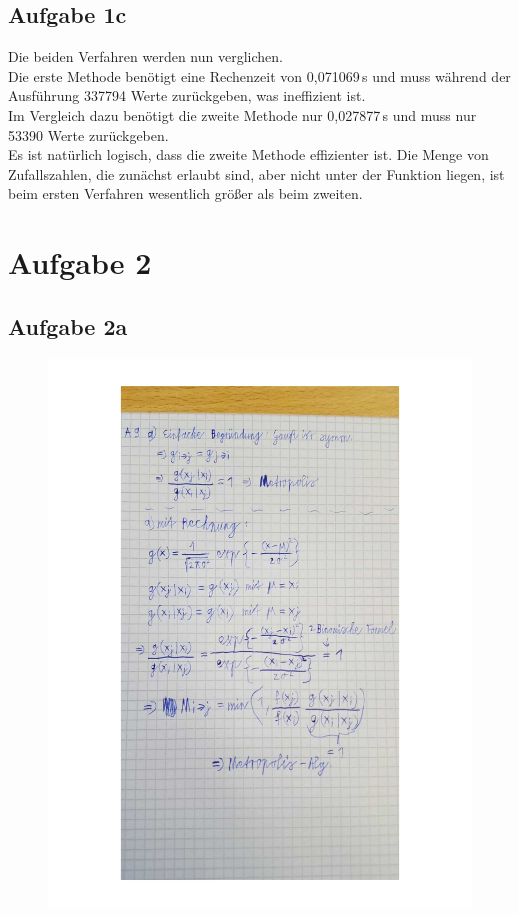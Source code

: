     \subsection{Aufgabe 1c}

      Die beiden Verfahren werden nun verglichen. \\
      Die erste Methode benötigt eine Rechenzeit von 0,071069\,s und
      muss während der Ausführung 337794 Werte zurückgeben, was ineffizient ist.\\
      Im Vergleich dazu benötigt die zweite Methode nur 0,027877\,s und
      muss nur 53390 Werte zurückgeben.\\
      Es ist natürlich logisch, dass die
      zweite Methode effizienter ist. Die Menge von Zufallszahlen, die
      zunächst erlaubt sind, aber nicht unter der Funktion liegen, ist beim
      ersten Verfahren wesentlich größer als beim zweiten.

  \section{Aufgabe 2}

    \subsection{Aufgabe 2a}

    \begin{figure}[H]
      \centering
      \includegraphics[width=\textwidth]{Aufgabe9a.pdf}
    \end{figure}

